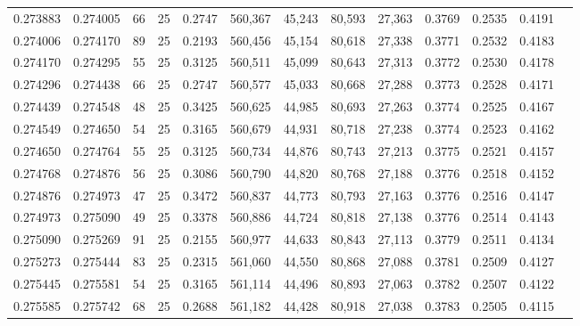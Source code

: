\begin{tabular}{rrrrrrrrrrrrr}
0.273883 & 0.274005 &    66 &  25 &                                     0.2747 & 560,367 &  45,243 &  80,593 &  27,363 & 0.3769 & 0.2535 & 0.4191 \\
0.274006 & 0.274170 &    89 &  25 &                                     0.2193 & 560,456 &  45,154 &  80,618 &  27,338 & 0.3771 & 0.2532 & 0.4183 \\
0.274170 & 0.274295 &    55 &  25 &                                     0.3125 & 560,511 &  45,099 &  80,643 &  27,313 & 0.3772 & 0.2530 & 0.4178 \\
0.274296 & 0.274438 &    66 &  25 &                                     0.2747 & 560,577 &  45,033 &  80,668 &  27,288 & 0.3773 & 0.2528 & 0.4171 \\
0.274439 & 0.274548 &    48 &  25 &                                     0.3425 & 560,625 &  44,985 &  80,693 &  27,263 & 0.3774 & 0.2525 & 0.4167 \\
0.274549 & 0.274650 &    54 &  25 &                                     0.3165 & 560,679 &  44,931 &  80,718 &  27,238 & 0.3774 & 0.2523 & 0.4162 \\
0.274650 & 0.274764 &    55 &  25 &                                     0.3125 & 560,734 &  44,876 &  80,743 &  27,213 & 0.3775 & 0.2521 & 0.4157 \\
0.274768 & 0.274876 &    56 &  25 &                                     0.3086 & 560,790 &  44,820 &  80,768 &  27,188 & 0.3776 & 0.2518 & 0.4152 \\
0.274876 & 0.274973 &    47 &  25 &                                     0.3472 & 560,837 &  44,773 &  80,793 &  27,163 & 0.3776 & 0.2516 & 0.4147 \\
0.274973 & 0.275090 &    49 &  25 &                                     0.3378 & 560,886 &  44,724 &  80,818 &  27,138 & 0.3776 & 0.2514 & 0.4143 \\
0.275090 & 0.275269 &    91 &  25 &                                     0.2155 & 560,977 &  44,633 &  80,843 &  27,113 & 0.3779 & 0.2511 & 0.4134 \\
0.275273 & 0.275444 &    83 &  25 &                                     0.2315 & 561,060 &  44,550 &  80,868 &  27,088 & 0.3781 & 0.2509 & 0.4127 \\
0.275445 & 0.275581 &    54 &  25 &                                     0.3165 & 561,114 &  44,496 &  80,893 &  27,063 & 0.3782 & 0.2507 & 0.4122 \\
0.275585 & 0.275742 &    68 &  25 &                                     0.2688 & 561,182 &  44,428 &  80,918 &  27,038 & 0.3783 & 0.2505 & 0.4115 \\

\end{tabular}
